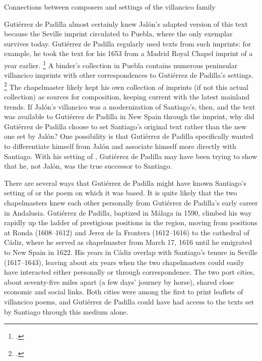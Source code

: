 \begin{table}
    \caption{Connections between composers and settings of the 
    villancico family}
  
    \label{tab:Voces-connections}
\end{table}

Gutiérrez de Padilla almost certainly knew Jalón's adapted version of this text
because the Seville imprint circulated to Puebla, where the only exemplar
survives today.
Gutiérrez de Padilla regularly used texts from such imprints: for example, he
took the text for his 1653  from a Madrid Royal
Chapel imprint of a year earlier.%
    \footnote{.}
A binder's collection in Puebla contains numerous peninsular villancico imprints
with other correspondences to Gutiérrez de Padilla's settings.%
    \footnote{.}
The chapelmaster likely kept his own collection of imprints (if not this actual
collection) as sources for composition, keeping current with the latest mainland
trends.
If Jalón's villancico was a modernization of Santiago's, then, and the text was
available to Gutiérrez de Padilla in New Spain through the imprint, why did
Gutiérrez de Padilla choose to set Santiago's original text rather than the new
one set by Jalón?
One possibility is that Gutiérrez de Padilla specifically wanted to
differentiate himself from Jalón and associate himself more directly with
Santiago.
With his setting of , Gutiérrez de Padilla may
have been trying to show that he, not Jalón, was the true successor to Santiago.

There are several ways that Gutiérrez de Padilla might have known Santiago's
setting of  or the poem on which it was based.
It is quite likely that the two chapelmasters knew each other personally from
Gutiérrez de Padilla's early career in Andalusia.
Gutiérrez de Padilla, baptized in Málaga in 1590, climbed his way rapidly up the
ladder of prestigious positions in the region, moving from positions at Ronda
(1608--1612)
and Jerez de la Frontera (1612--1616) to the cathedral of Cádiz, where he served
as chapelmaster from March 17, 1616 until he emigrated to New Spain in 1622.%
    \Autocite{Gembero:Padilla}
His years in Cádiz overlap with Santiago's tenure in Seville (1617--1643),
leaving about six years when the two chapelmasters could easily have interacted
either personally or through correspondence.
The two port cities, about seventy-five miles apart (a few days' journey by
horse), shared close economic and social links.
Both cities were among the first to print leaflets of villancico poems, and
Gutiérrez de Padilla could have had access to the texts set by Santiago through
this medium alone.%
    \Autocite
    [ and \emph{Sevilla}]
    {BNE:VCs17C}

